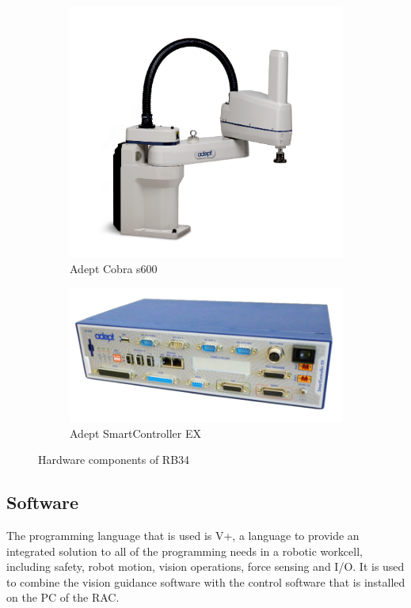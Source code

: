 \begin{figure}[ht]
\centering
\begin{subfigure}[b]{0.49\textwidth}
\includegraphics[width=\textwidth]{Figures/Cobra-600}
\caption{Adept Cobra s600}
\label{fig:Cobra s600}
\end{subfigure}
\begin{subfigure}[b]{0.49\textwidth}
\includegraphics[width=\textwidth]{Figures/SmartController}
\caption{Adept SmartController EX}
\label{fig:SmartController}
\end{subfigure}
\caption[Relevant hardware components of RB34]{Hardware components of RB34}
\label{fig:HardwareComponents}
\end{figure}

\subsection{Software} \label{Software}
The programming language that is used is V+, a language to provide an integrated solution to all of the programming needs in a robotic workcell, including safety, robot motion, vision operations, force sensing and I/O. It is used to combine the vision guidance software with the control software that is installed on the PC of the RAC. 

